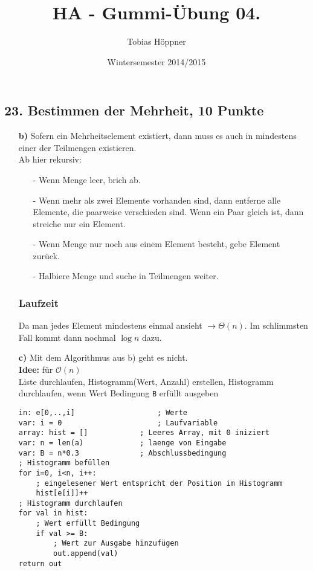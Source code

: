 \documentclass[ngerman,a4paper]{report}
\author{Tobias Höppner}
\title{HA - Gummi-Übung 04. }
\date{Wintersemester 2014/2015}
\renewcommand{\maketitle}{}
\begin{document}
 
\maketitle 

\subsection*{23. Bestimmen der Mehrheit, 10 Punkte}

\begin{enumerate}
\item[\textbf{b)}]
Sofern ein Mehrheitselement existiert, dann muss es auch in mindestens einer der Teilmengen existieren.\\
Ab hier rekursiv:
\begin{enumerate}
\item[-] Wenn Menge leer, brich ab.
\item[-] Wenn mehr als zwei Elemente vorhanden sind, dann entferne alle Elemente, die paarweise verschieden sind. Wenn ein Paar gleich ist, dann streiche nur ein Element.
\item[-] Wenn Menge nur noch aus einem Element besteht, gebe Element zurück.
\item[-] Halbiere Menge und suche in Teilmengen weiter. 
\end{enumerate}
\subsubsection*{Laufzeit}
Da man jedes Element mindestens einmal ansieht $\rightarrow \Theta (n)$. Im schlimmsten Fall kommt dann nochmal $\log n$ dazu.\\
\item[\textbf{c)}] Mit dem Algorithmus aus b) geht es nicht.\\
\textbf{Idee:} für $\mathcal{O}(n)$\\
Liste durchlaufen, Histogramm(Wert, Anzahl) erstellen, Histogramm durchlaufen, wenn Wert Bedingung \lstinline!B! erfüllt ausgeben
\begin{lstlisting}
in: e[0,..,i]					; Werte
var: i = 0						; Laufvariable
array: hist = []			; Leeres Array, mit 0 iniziert
var: n = len(a) 			; laenge von Eingabe
var: B = n*0.3				; Abschlussbedingung
; Histogramm befüllen
for i=0, i<n, i++:
	; eingelesener Wert entspricht der Position im Histogramm
	hist[e[i]]++
; Histogramm durchlaufen
for val in hist:
	; Wert erfüllt Bedingung
	if val >= B:
		; Wert zur Ausgabe hinzufügen
		out.append(val)
return out
\end{lstlisting}

\end{enumerate}
\end{document}
